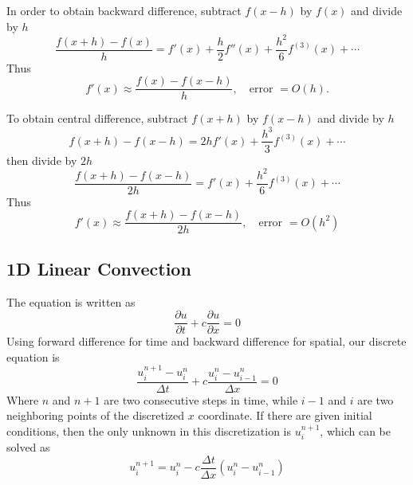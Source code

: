 \documentclass[../../../main.tex]{subfiles}
\begin{document}
In order to obtain backward difference, subtract $f(x-h)$ by $f(x)$ and divide by $h$
\begin{equation*}
    \frac{f(x+h) - f(x)}{h} = f'(x) + \frac{h}{2} f''(x) + \frac{h^2}{6} f^{(3)}(x) +\cdots
\end{equation*}
Thus
\begin{equation*}
    f'(x) \approx \frac{f(x) - f(x-h)}{h}, \quad \text{error } = O(h).
\end{equation*}

To obtain central difference, subtract $f(x+h)$ by $f(x-h)$ and divide by $h$
\begin{equation*}
    f(x+h) - f(x-h) = 2h f'(x) + \frac{h^3}{3} f^{(3)}(x) +\cdots
\end{equation*}
then divide by $2h$
\begin{equation*}
    \frac{f(x+h) - f(x-h)}{2h} = f'(x) + \frac{h^2}{6} f^{(3)}(x) +\cdots
\end{equation*}
Thus
\begin{equation*}
    f'(x) \approx \frac{f(x+h) - f(x-h)}{2h}, \quad \text{error } = O(h^2)
\end{equation*}

\subsection{1D Linear Convection}
The equation is written as
\begin{equation*}
    \frac{\partial u}{\partial t} + c \frac{\partial u}{\partial x} = 0
\end{equation*}
Using forward difference for time and backward difference for spatial, our discrete equation is
\begin{equation*}
    \frac{u_i^{n+1}-u_i^n}{\Delta t} + c \frac{u_i^n - u_{i-1}^n}{\Delta x} = 0
\end{equation*}
Where $n$ and $n+1$ are two consecutive steps in time, while $i-1$ and $i$ are two neighboring points of the discretized $x$ coordinate.
If there are given initial conditions, then the only unknown in this discretization is $u_i^{n+1}$, which can be solved as
\begin{equation*}
    u_i^{n+1} = u_i^n - c \frac{\Delta t}{\Delta x}(u_i^n-u_{i-1}^n)
\end{equation*}
\end{document}
